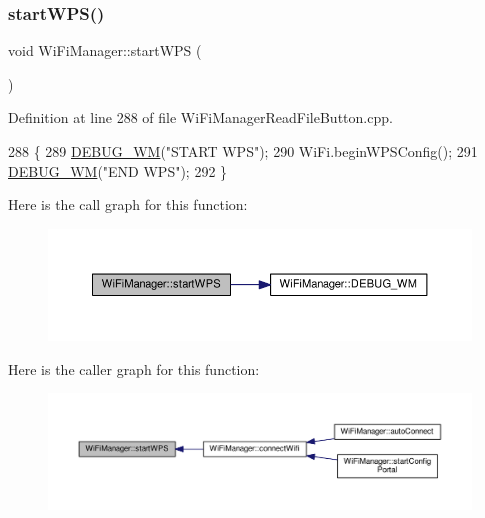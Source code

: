 \mbox{\label{class_wi_fi_manager_abcc403fc26a47f7a111d1271f1d0869e}} 
\subsubsection{\texorpdfstring{start\+W\+P\+S()}{startWPS()}}
{\footnotesize\ttfamily void Wi\+Fi\+Manager\+::start\+W\+PS (\begin{DoxyParamCaption}{ }\end{DoxyParamCaption})\hspace{0.3cm}{\ttfamily [private]}}



Definition at line 288 of file Wi\+Fi\+Manager\+Read\+File\+Button.\+cpp.


\begin{DoxyCode}
288                            \{
289   \hyperlink{class_wi_fi_manager_ae5f595c670ccbcf9a191baf50f5c7c26}{DEBUG\_WM}(\textcolor{stringliteral}{"START WPS"});
290   WiFi.beginWPSConfig();
291   \hyperlink{class_wi_fi_manager_ae5f595c670ccbcf9a191baf50f5c7c26}{DEBUG\_WM}(\textcolor{stringliteral}{"END WPS"});
292 \}
\end{DoxyCode}
Here is the call graph for this function\+:\nopagebreak
\begin{figure}[H]
\begin{center}
\leavevmode
\includegraphics[width=350pt]{d4/dc8/class_wi_fi_manager_abcc403fc26a47f7a111d1271f1d0869e_cgraph}
\end{center}
\end{figure}
Here is the caller graph for this function\+:\nopagebreak
\begin{figure}[H]
\begin{center}
\leavevmode
\includegraphics[width=350pt]{d4/dc8/class_wi_fi_manager_abcc403fc26a47f7a111d1271f1d0869e_icgraph}
\end{center}
\end{figure}
\mbox{\label{class_wi_fi_manager_a8dfd64cefecbdf26242b16eca335c20b}} 

